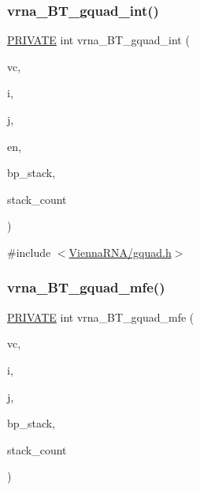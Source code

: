 \subsubsection{\texorpdfstring{vrna\+\_\+\+B\+T\+\_\+gquad\+\_\+int()}{vrna\_BT\_gquad\_int()}}
{\footnotesize\ttfamily \mbox{\hyperlink{group__utils_ga5e151c615eda34903514212f05a5ccf8}{P\+R\+I\+V\+A\+TE}} int vrna\+\_\+\+B\+T\+\_\+gquad\+\_\+int (\begin{DoxyParamCaption}\item[{\mbox{\hyperlink{group__fold__compound_ga1b0cef17fd40466cef5968eaeeff6166}{vrna\+\_\+fold\+\_\+compound\+\_\+t}} $\ast$}]{vc,  }\item[{int}]{i,  }\item[{int}]{j,  }\item[{int}]{en,  }\item[{\mbox{\hyperlink{group__data__structures_gaa651bda42e7692f08cb603cd6834b0ee}{vrna\+\_\+bp\+\_\+stack\+\_\+t}} $\ast$}]{bp\+\_\+stack,  }\item[{int $\ast$}]{stack\+\_\+count }\end{DoxyParamCaption})}



{\ttfamily \#include $<$\mbox{\hyperlink{gquad_8h}{Vienna\+R\+N\+A/gquad.\+h}}$>$}

\mbox{\label{group__gquads_gad10fb8ad7ce3ba46d7d53ca7fefbcd80}} 
\subsubsection{\texorpdfstring{vrna\+\_\+\+B\+T\+\_\+gquad\+\_\+mfe()}{vrna\_BT\_gquad\_mfe()}}
{\footnotesize\ttfamily \mbox{\hyperlink{group__utils_ga5e151c615eda34903514212f05a5ccf8}{P\+R\+I\+V\+A\+TE}} int vrna\+\_\+\+B\+T\+\_\+gquad\+\_\+mfe (\begin{DoxyParamCaption}\item[{\mbox{\hyperlink{group__fold__compound_ga1b0cef17fd40466cef5968eaeeff6166}{vrna\+\_\+fold\+\_\+compound\+\_\+t}} $\ast$}]{vc,  }\item[{int}]{i,  }\item[{int}]{j,  }\item[{\mbox{\hyperlink{group__data__structures_gaa651bda42e7692f08cb603cd6834b0ee}{vrna\+\_\+bp\+\_\+stack\+\_\+t}} $\ast$}]{bp\+\_\+stack,  }\item[{int $\ast$}]{stack\+\_\+count }\end{DoxyParamCaption})}



